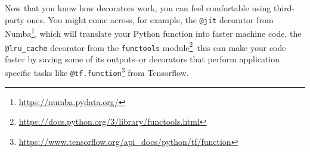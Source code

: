 \documentclass[
  12pt,
  krantz2]{krantz}
\renewcommand{\href}[2]{#2\footnote{\url{#1}}}
\begin{document}
Now that you know how decorators work, you can feel comfortable using third-party ones. You might come across, for example, the \texttt{@jit} decorator from \href{https://numba.pydata.org/}{Numba}, which will translate your Python function into faster machine code, the \texttt{@lru\_cache} decorator from the \href{https://docs.python.org/3/library/functools.html}{\texttt{functools} module}--this can make your code faster by saving some of its outputs--or decorators that perform application specific tasks like \href{https://www.tensorflow.org/api_docs/python/tf/function}{\texttt{@tf.function}} from Tensorflow.

  

\backmatter
\printindex
\end{document}
